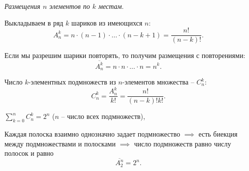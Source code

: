 \begin{definition}
  \emph{Размещения $n$ элементов по $k$ местам}.

  Выкладываем в ряд $k$ шариков из имеющихся $n$:
  \[
    A^{k}_{n} = n \cdot (n-1) \cdot \ldots \cdot (n-k+1) = \frac{n!}{(n-k)!}.
  \]
\end{definition}

\begin{remark}
  Если мы разрешим шарики повторять, то получим размещения с повторениями:
  \[
    \overline{A^{k}_{n}} = n \cdot n \cdot \ldots \cdot n = n^{k}.
  \]
\end{remark}

\begin{definition}
  Число $k$-элементных подмножеств из $n$-элементов множества -- $C^{k}_{n}$:
  \[
    C^{k}_{n} = \frac{A^{k}_{n}}{k!} = \frac{n!}{(n-k)!k!}.
  \]
\end{definition}

\begin{eg}
  $\sum_{k=0}^{n}C^{k}_{n} = 2^n$ ($n$ -- число всех подмножеств),
  \begin{figure}[H]
    \centering
    \label{fig:fig-3}
  \end{figure}

  Каждая полоска взаимно однозначно задает подмножество $\implies $ есть биекция между подмножествами и полосками $\implies $ число подмножеств равно числу полосок и равно
  \[
    \overline{A_{2}^{n}} = 2^n.
  \]
\end{eg}

